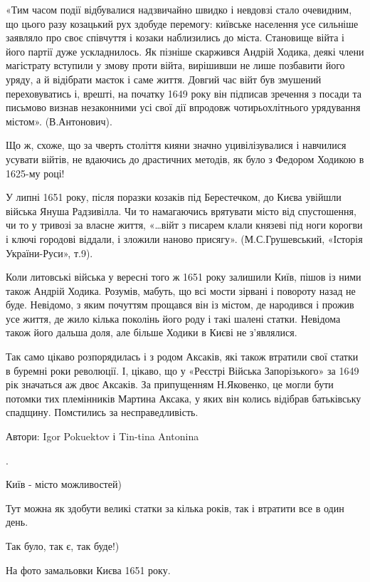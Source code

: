 «Тим часом події відбувалися надзвичайно швидко і невдовзі стало очевидним, що
цього разу козацький рух здобуде перемогу: київське населення усе сильніше
заявляло про своє співчуття і козаки наблизились до міста. Становище війта і
його партії дуже ускладнилось. Як пізніше скаржився Андрій Ходика, деякі члени
магістрату вступили у змову проти війта, вирішивши не лише позбавити його
уряду, а й відібрати маєток і саме життя. Довгий час війт був змушений
переховуватись і, врешті, на початку 1649 року він підписав зречення з посади
та письмово визнав незаконними усі свої дії впродовж чотирьохлітнього
урядування містом». (В.Антонович).

Що ж, схоже, що за чверть століття кияни значно уцивілізувалися і навчилися
усувати війтів, не вдаючись до драстичних методів, як було з Федором Ходикою в
1625-му році!

У липні 1651 року, після поразки козаків під Берестечком, до Києва увійшли
війська Януша Радзивілла. Чи то намагаючись врятувати місто від спустошення, чи
то у тривозі за власне життя, «…війт з писарем клали князеві під ноги корогви і
ключі городові віддали, і зложили наново присягу». (М.С.Грушевський, «Історія
України-Руси», т.9). 

Коли литовські війська у вересні того ж 1651 року залишили  Київ, пішов із ними
також Андрій Ходика. Розумів, мабуть, що всі мости зірвані і повороту назад не
буде. Невідомо, з яким почуттям прощався він із містом, де народився і прожив
усе життя, де жило кілька поколінь його роду і такі шалені статки. Невідома
також його дальша доля, але більше Ходики в Києві не з’являлися.

Так само цікаво розпорядилась і з родом Аксаків, які також втратили свої статки
в буремні роки революції. І, цікаво, що у «Реєстрі Війська Запорізького» за
1649 рік значаться аж двоє Аксаків. За припущенням Н.Яковенко, це могли бути
потомки тих племінників Мартина Аксака, у яких він колись відібрав батьківську
спадщину. Помстились за несправедливість.

Автори: Igor Pokuektov і Tin-tina Antonina

.

Київ - місто можливостей)

Тут можна як здобути великі статки за кілька років, так і втратити все в один
день.

Так було, так є, так буде!)

На фото замальовки Києва 1651 року.
